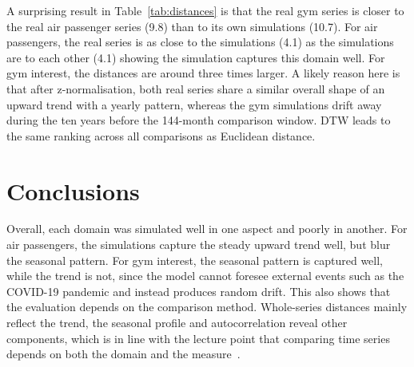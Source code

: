 \documentclass[11pt,a4paper]{article}
\begin{document}
A surprising result in Table~\ref{tab:distances} is that the real gym series is closer to the real air passenger series (9.8) than to its own simulations (10.7). For air passengers, the real series is as close to the simulations (4.1) as the simulations are to each other (4.1) showing the simulation captures this domain well. For gym interest, the distances are around three times larger. A likely reason here is that after z-normalisation, both real series share a similar overall shape of an upward trend with a yearly pattern, whereas the gym simulations drift away during the ten years before the 144-month comparison window. DTW leads to the same ranking across all comparisons as Euclidean distance.

%
%

\section{Conclusions}

Overall, each domain was simulated well in one aspect and poorly in another. For air passengers, the simulations capture the steady upward trend well, but blur the seasonal pattern. For gym interest, the seasonal pattern is captured well, while the trend is not, since the model cannot foresee external events such as the COVID-19 pandemic and instead produces random drift. This also shows that the evaluation depends on the comparison method. Whole-series distances mainly reflect the trend, the seasonal profile and autocorrelation reveal other components, which is in line with the lecture point that comparing time series depends on both the domain and the measure~\cite{lecture-ts}.
\end{document}
